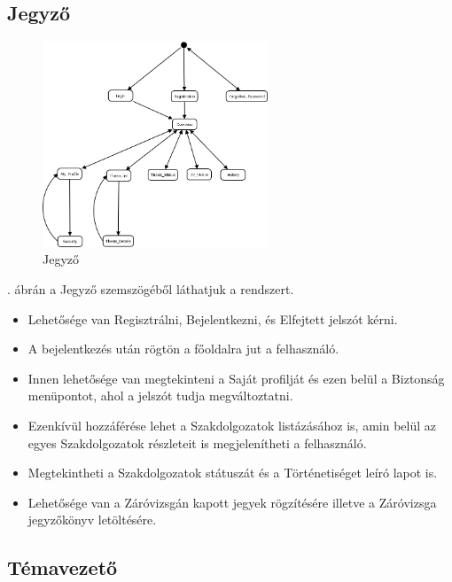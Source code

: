 \documentclass[a4paper,12pt]{article}
\begin{document}
\subsection{Jegyző}

\begin{figure}[h!]
	\centering
	\includegraphics[width=0.6\textwidth]{images/Lapok_kozotti_atmenetek/Jegyzo.png}
	\caption{Jegyző}
	\label{fig:Jegyzo}
\end{figure}

. ábrán a Jegyző szemszögéből láthatjuk a rendszert. 

\begin{itemize}
	\item Lehetősége van Regisztrálni, Bejelentkezni, és Elfejtett jelszót kérni. 
	\item A bejelentkezés után rögtön a főoldalra jut a felhasználó. 
	\item Innen lehetősége van megtekinteni a Saját profilját és ezen belül a Biztonság menüpontot, ahol a jelszót tudja megváltoztatni. 
	\item Ezenkívül hozzáférése lehet a Szakdolgozatok listázásához is, amin belül az egyes Szakdolgozatok részleteit is megjelenítheti a felhasználó. 
	\item Megtekintheti a Szakdolgozatok státuszát és a Történetiséget leíró lapot is. 
	\item Lehetősége van a Záróvizsgán kapott jegyek rögzítésére illetve a Záróvizsga jegyzőkönyv letöltésére. 
\end{itemize}

\subsection{Témavezető}
\end{document}
